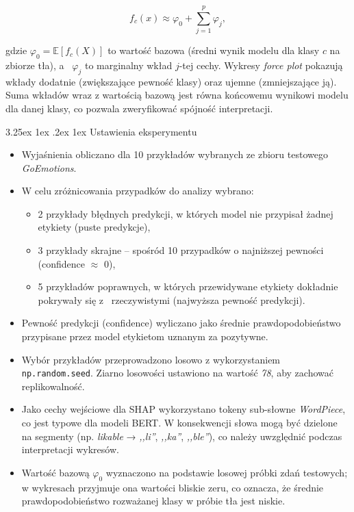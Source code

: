 \documentclass[wmii, inf, mgr]{uwmthesis}
\makeatletter
\renewcommand\paragraph{\@startsection{paragraph}{4}{\z@}%
  {3.25ex \@plus1ex \@minus.2ex}%
  {1ex}%
  {\normalfont\normalsize\bfseries}}
\makeatother
\begin{document}
\[
f_c(x) \approx \varphi_0 + \sum_{j=1}^p \varphi_j,
\]

gdzie \(\varphi_0 = \mathbb{E}[f_c(X)]\) to wartość bazowa (średni wynik modelu dla klasy \(c\) na zbiorze tła), a~ \(\varphi_j\) to marginalny wkład \(j\)-tej cechy. Wykresy \textit{force plot} pokazują wkłady dodatnie (zwiększające pewność klasy) oraz ujemne (zmniejszające ją). Suma wkładów wraz z wartością bazową jest równa końcowemu wynikowi modelu dla danej klasy, co pozwala zweryfikować spójność interpretacji. 


\paragraph{Ustawienia eksperymentu}

\begin{itemize}
	\item Wyjaśnienia obliczano dla 10 przykładów wybranych ze zbioru testowego \textit{GoEmotions}.
	\item W celu zróżnicowania przypadków do analizy wybrano:
	\begin{itemize}
		\item 2 przykłady błędnych predykcji, w których model nie przypisał żadnej etykiety (puste predykcje),
		\item 3 przykłady skrajne -- spośród 10 przypadków o najniższej pewności (confidence $\approx$ 0),
		\item 5 przykładów poprawnych, w których przewidywane etykiety dokładnie pokrywały się z~ rzeczywistymi (najwyższa pewność predykcji).
	\end{itemize}
	\item Pewność predykcji (confidence) wyliczano jako średnie prawdopodobieństwo przypisane przez model etykietom uznanym za pozytywne.
	\item Wybór przykładów przeprowadzono losowo z wykorzystaniem \texttt{np.random.seed}. Ziarno losowości ustawiono na wartość \textit{78}, aby zachować replikowalność.
	\item Jako cechy wejściowe dla SHAP wykorzystano tokeny sub-słowne \textit{WordPiece}, co jest typowe dla modeli BERT. W konsekwencji słowa mogą być dzielone na segmenty (np. \textit{likable} → \textit{,,li''}, \textit{,,ka''}, \textit{,,ble''}), co należy uwzględnić podczas interpretacji wykresów.
	\item Wartość bazową \(\varphi_0\) wyznaczono na podstawie losowej próbki zdań testowych; w wykresach przyjmuje ona wartości bliskie zeru, co oznacza, że średnie prawdopodobieństwo rozważanej klasy w próbie tła jest niskie.
\end{itemize}
\end{document}
